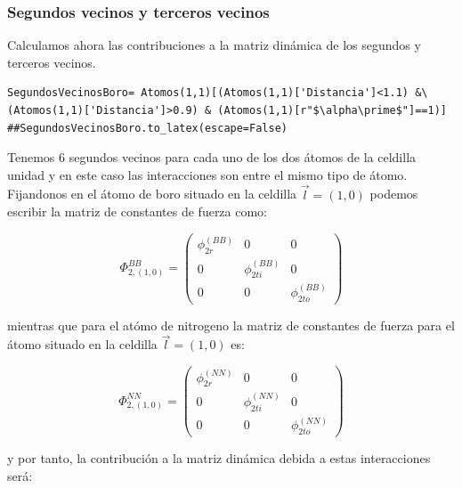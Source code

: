 \documentclass[12pt,a4paper]{article}
\begin{document}
\newpage
\eject \pdfpagewidth=210mm \pdfpageheight=297mm

\subsubsection{Segundos vecinos y terceros vecinos}
\label{sec:orgca2624e}

Calculamos ahora las contribuciones a la matriz dinámica de los segundos y terceros vecinos.

\begin{verbatim}
SegundosVecinosBoro= Atomos(1,1)[(Atomos(1,1)['Distancia']<1.1) &\
(Atomos(1,1)['Distancia']>0.9) & (Atomos(1,1)[r"$\alpha\prime$"]==1)]
##SegundosVecinosBoro.to_latex(escape=False)
\end{verbatim}

Tenemos \(6\) segundos vecinos para cada uno de los dos átomos de la celdilla unidad y en este caso las interacciones son entre el mismo tipo de átomo. Fijandonos en el átomo de boro situado en la celdilla \(\vec l=(1,0)\) podemos escribir la matriz de constantes de fuerza como:

\begin{equation}
\Phi_{2,(1,0)}^{BB}=\begin{pmatrix}
\phi_{2r}^{(BB)} & 0 & 0 \\
0 & \phi_{2ti}^{(BB)} & 0 \\
 0 & 0  & \phi_{2to}^{(BB)}
\end{pmatrix}
\end{equation} 

mientras que para el atómo de nitrogeno la matriz de constantes de fuerza para el átomo situado en la celdilla \(\vec l =(1,0)\) es:

\begin{equation}
\Phi_{2,(1,0)}^{NN}=\begin{pmatrix}
\phi_{2r}^{(NN)} & 0 & 0 \\
0 & \phi_{2ti}^{(NN)} & 0 \\
 0 & 0  & \phi_{2to}^{(NN)}
\end{pmatrix}
\end{equation} 

y por tanto, la contribución a la matriz dinámica debida a estas interacciones será:
\end{document}
